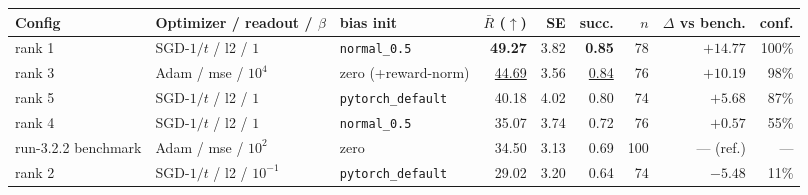 \begin{tabular}{@{}l l l r r r r r r@{}}
\toprule
\textbf{Config} & \textbf{Optimizer / readout / $\beta$} & \textbf{bias init} & \textbf{$\bar{R}$ ($\uparrow$)} & \textbf{SE} & \textbf{succ.} & \textbf{$n$} & \textbf{$\Delta$ vs bench.} & \textbf{conf.} \\
\midrule
rank 1 & SGD-$1/t$ / l2 / $1$ & \texttt{normal\_0.5} & \textbf{49.27} & 3.82 & \textbf{0.85} & 78 & $+14.77$ & 100\% \\
rank 3 & Adam / mse / $10^{4}$ & zero (+reward-norm) & \underline{44.69} & 3.56 & \underline{0.84} & 76 & $+10.19$ & 98\% \\
rank 5 & SGD-$1/t$ / l2 / $1$ & \texttt{pytorch\_\allowbreak default} & 40.18 & 4.02 & 0.80 & 74 & $+5.68$ & 87\% \\
rank 4 & SGD-$1/t$ / l2 / $1$ & \texttt{normal\_0.5} & 35.07 & 3.74 & 0.72 & 76 & $+0.57$ & 55\% \\
run-3.2.2 benchmark & Adam / mse / $10^{2}$ & zero & 34.50 & 3.13 & 0.69 & 100 & --- (ref.) & --- \\
rank 2 & SGD-$1/t$ / l2 / $10^{-1}$ & \texttt{pytorch\_\allowbreak default} & 29.02 & 3.20 & 0.64 & 74 & $-5.48$ & 11\% \\
\bottomrule
\end{tabular}
